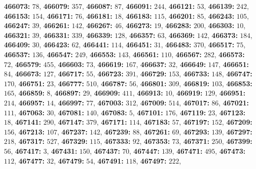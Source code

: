 \textsf{\bfseries 466073:} $78$, \textsf{\bfseries 466079:} $357$, \textsf{\bfseries 466087:} $87$, \textsf{\bfseries 466091:} $244$, \textsf{\bfseries 466121:} $53$, \textsf{\bfseries 466139:} $242$, \textsf{\bfseries 466153:} $154$, \textsf{\bfseries 466171:} $76$, \textsf{\bfseries 466181:} $18$, \textsf{\bfseries 466183:} $115$, \textsf{\bfseries 466201:} $85$, \textsf{\bfseries 466243:} $105$, \textsf{\bfseries 466247:} $39$, \textsf{\bfseries 466261:} $142$, \textsf{\bfseries 466267:} $46$, \textsf{\bfseries 466273:} $19$, \textsf{\bfseries 466283:} $200$, \textsf{\bfseries 466303:} $10$, \textsf{\bfseries 466321:} $39$, \textsf{\bfseries 466331:} $339$, \textsf{\bfseries 466339:} $128$, \textsf{\bfseries 466357:} $63$, \textsf{\bfseries 466369:} $142$, \textsf{\bfseries 466373:} $184$, \textsf{\bfseries 466409:} $30$, \textsf{\bfseries 466423:} $62$, \textsf{\bfseries 466441:} $114$, \textsf{\bfseries 466451:} $31$, \textsf{\bfseries 466483:} $370$, \textsf{\bfseries 466517:} $75$, \textsf{\bfseries 466537:} $136$, \textsf{\bfseries 466547:} $249$, \textsf{\bfseries 466553:} $143$, \textsf{\bfseries 466561:} $110$, \textsf{\bfseries 466567:} $282$, \textsf{\bfseries 466573:} $72$, \textsf{\bfseries 466579:} $455$, \textsf{\bfseries 466603:} $73$, \textsf{\bfseries 466619:} $167$, \textsf{\bfseries 466637:} $32$, \textsf{\bfseries 466649:} $147$, \textsf{\bfseries 466651:} $84$, \textsf{\bfseries 466673:} $127$, \textsf{\bfseries 466717:} $55$, \textsf{\bfseries 466723:} $391$, \textsf{\bfseries 466729:} $153$, \textsf{\bfseries 466733:} $148$, \textsf{\bfseries 466747:} $170$, \textsf{\bfseries 466751:} $23$, \textsf{\bfseries 466777:} $510$, \textsf{\bfseries 466787:} $56$, \textsf{\bfseries 466801:} $309$, \textsf{\bfseries 466819:} $103$, \textsf{\bfseries 466853:} $165$, \textsf{\bfseries 466859:} $8$, \textsf{\bfseries 466897:} $29$, \textsf{\bfseries 466909:} $411$, \textsf{\bfseries 466913:} $10$, \textsf{\bfseries 466919:} $129$, \textsf{\bfseries 466951:} $214$, \textsf{\bfseries 466957:} $14$, \textsf{\bfseries 466997:} $77$, \textsf{\bfseries 467003:} $312$, \textsf{\bfseries 467009:} $514$, \textsf{\bfseries 467017:} $86$, \textsf{\bfseries 467021:} $111$, \textsf{\bfseries 467063:} $30$, \textsf{\bfseries 467081:} $140$, \textsf{\bfseries 467083:} $5$, \textsf{\bfseries 467101:} $176$, \textsf{\bfseries 467119:} $23$, \textsf{\bfseries 467123:} $18$, \textsf{\bfseries 467141:} $290$, \textsf{\bfseries 467147:} $379$, \textsf{\bfseries 467171:} $114$, \textsf{\bfseries 467183:} $57$, \textsf{\bfseries 467197:} $152$, \textsf{\bfseries 467209:} $156$, \textsf{\bfseries 467213:} $107$, \textsf{\bfseries 467237:} $142$, \textsf{\bfseries 467239:} $88$, \textsf{\bfseries 467261:} $69$, \textsf{\bfseries 467293:} $139$, \textsf{\bfseries 467297:} $218$, \textsf{\bfseries 467317:} $527$, \textsf{\bfseries 467329:} $115$, \textsf{\bfseries 467333:} $92$, \textsf{\bfseries 467353:} $73$, \textsf{\bfseries 467371:} $250$, \textsf{\bfseries 467399:} $56$, \textsf{\bfseries 467417:} $3$, \textsf{\bfseries 467431:} $150$, \textsf{\bfseries 467437:} $70$, \textsf{\bfseries 467447:} $139$, \textsf{\bfseries 467471:} $495$, \textsf{\bfseries 467473:} $112$, \textsf{\bfseries 467477:} $32$, \textsf{\bfseries 467479:} $54$, \textsf{\bfseries 467491:} $118$, \textsf{\bfseries 467497:} $222$, 
